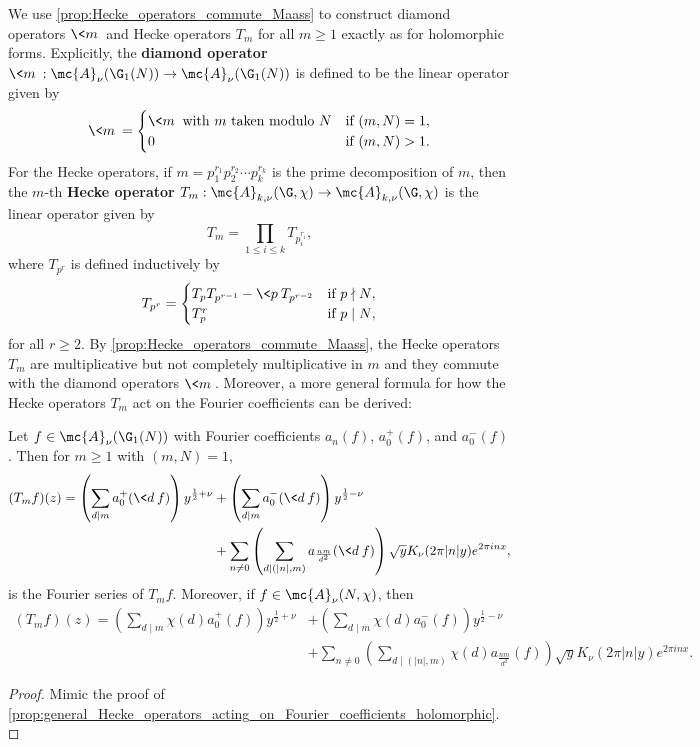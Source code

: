     We use \cref{prop:Hecke_operators_commute_Maass} to construct diamond operators $\<m\>$ and Hecke operators $T_{m}$ for all $m \ge 1$ exactly as for holomorphic forms. Explicitly, the \textbf{diamond operator} $\<m\>:\mc{A}_{\nu}(\G_{1}(N)) \to \mc{A}_{\nu}(\G_{1}(N))$ is defined to be the linear operator given by
    \[
      \<m\> = \begin{cases} \<m\> \text{ with $m$ taken modulo $N$} & \text{if $(m,N) = 1$}, \\ 0 & \text{if $(m,N) > 1$}. \end{cases}
    \]
    For the Hecke operators, if $m = p_{1}^{r_{1}}p_{2}^{r_{2}} \cdots p_{k}^{r_{k}}$ is the prime decomposition of $m$, then the $m$-th \textbf{Hecke operator} $T_{m}:\mc{A}_{k,\nu}(\G,\chi) \to \mc{A}_{k,\nu}(\G,\chi)$ is the linear operator given by
    \[
      T_{m} = \prod_{1 \le i \le k}T_{p_{i}^{r_{i}}},
    \]
    where $T_{p^{r}}$ is defined inductively by
    \[
      T_{p^{r}} = \begin{cases} T_{p}T_{p^{r-1}}-\<p\>T_{p^{r-2}} & \text{if $p \nmid N$}, \\ T_{p}^{r} & \text{if $p \mid N$}, \end{cases}
    \]
    for all $r \ge 2$. By \cref{prop:Hecke_operators_commute_Maass}, the Hecke operators $T_{m}$ are multiplicative but not completely multiplicative in $m$ and they commute with the diamond operators $\<m\>$. Moreover, a more general formula for how the Hecke operators $T_{m}$ act on the Fourier coefficients can be derived:

    \begin{proposition}\label{prop:general_Hecke_operators_acting_on_Fourier_coefficients_Maass}
      Let $f \in \mc{A}_{\nu}(\G_{1}(N))$ with Fourier coefficients $a_{n}(f)$, $a_{0}^{+}(f)$, and $a_{0}^{-}(f)$. Then for $m \ge 1$ with $(m,N) = 1$,
      \begin{align*}
        (T_{m}f)(z) = \left(\sum_{d \mid m}a_{0}^{+}(\<d\>f)\right)y^{\frac{1}{2}+\nu}&+\left(\sum_{d \mid m}a_{0}^{-}(\<d\>f)\right)y^{\frac{1}{2}-\nu} \\
        &+ \sum_{n \neq 0}\left(\sum_{d \mid (|n|,m)}a_{\frac{nm}{d^{2}}}(\<d\>f)\right)\sqrt{y}K_{\nu}(2\pi|n|y)e^{2\pi inx},
      \end{align*}
      is the Fourier series of $T_{m}f$. Moreover, if $f \in \mc{A}_{\nu}(N,\chi)$, then
      \begin{align*}
        (T_{m}f)(z) = \left(\sum_{d \mid m}\chi(d)a_{0}^{+}(f)\right)y^{\frac{1}{2}+\nu}&+\left(\sum_{d \mid m}\chi(d)a_{0}^{-}(f)\right)y^{\frac{1}{2}-\nu} \\
        &+ \sum_{n \neq 0}\left(\sum_{d \mid (|n|,m)}\chi(d)a_{\frac{nm}{d^{2}}}(f)\right)\sqrt{y}K_{\nu}(2\pi|n|y)e^{2\pi inx}.
      \end{align*}
    \end{proposition}
    \begin{proof}
      Mimic the proof of \cref{prop:general_Hecke_operators_acting_on_Fourier_coefficients_holomorphic}.
    \end{proof}

